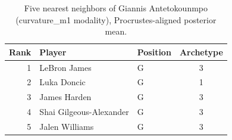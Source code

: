 \begin{table}[htbp]
  \centering\small
  \begin{tabular}{rllc}
    \toprule
    Rank & Player & Position & Archetype \\
    \midrule
    1 & LeBron James & G & 3 \\
    2 & Luka Doncic & G & 1 \\
    3 & James Harden & G & 3 \\
    4 & Shai Gilgeous-Alexander & G & 3 \\
    5 & Jalen Williams & G & 3 \\
    \bottomrule
  \end{tabular}
  \caption{Five nearest neighbors of Giannis Antetokounmpo (curvature_m1 modality), Procrustes-aligned posterior mean.}
  \label{tab:Giannis_Antetokounmpo_neighbors_curvature_m1}
\end{table}

